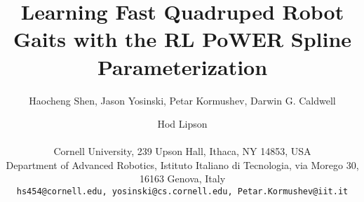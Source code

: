 \documentclass[letterpaper]{article}
\title{Learning Fast Quadruped Robot Gaits with the RL PoWER Spline Parameterization}
\author{Haocheng Shen, Jason Yosinski, Petar Kormushev, Darwin G. Caldwell \and Hod Lipson  \\
  \mbox{}\\
Cornell University, 239 Upson Hall, Ithaca, NY 14853, USA\\
Department of Advanced Robotics, Istituto Italiano di Tecnologia, via Morego 30, 16163 Genova, Italy \\
\texttt{hs454@cornell.edu, yosinski@cs.cornell.edu, Petar.Kormushev@iit.it}}
\begin{document}
\maketitle


\begin{abstract}

\end{abstract}
























\footnotesize


\end{document}
